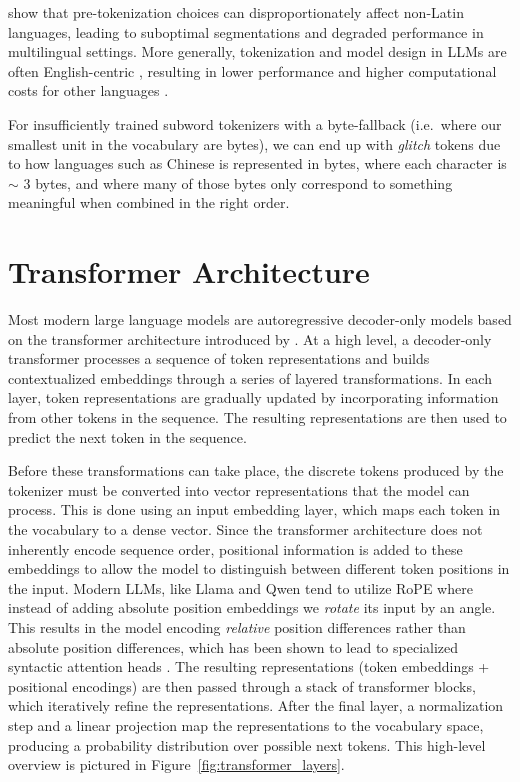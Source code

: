 \citet{arnett2025, wegmann2025} show that pre-tokenization choices can disproportionately affect non-Latin languages, leading to suboptimal segmentations and degraded performance in multilingual settings. More generally, tokenization and model design in LLMs are often English-centric \citep{joshi2020, blasi2022}, resulting in lower performance and higher computational costs for other languages \citep{ahia2023, petrov2023}.

For insufficiently trained subword tokenizers with a byte-fallback (i.e.\ where our smallest unit in the vocabulary are bytes), we can end up with \textit{glitch} tokens \citep{land2024} due to how languages such as Chinese is represented in bytes, where each character is $\sim$ 3 bytes, and where many of those bytes only correspond to something meaningful when combined in the right order.

\section{Transformer Architecture}\label{sec:background_transformer}

Most modern large language models are autoregressive decoder-only models based on the transformer architecture introduced by \citet{vaswani2017}. At a high level, a decoder-only transformer processes a sequence of token representations and builds contextualized embeddings through a series of layered transformations. In each layer, token representations are gradually updated by incorporating information from other tokens in the sequence. The resulting representations are then used to predict the next token in the sequence.

Before these transformations can take place, the discrete tokens produced by the tokenizer must be converted into vector representations that the model can process. This is done using an input embedding layer, which maps each token in the vocabulary to a dense vector. Since the transformer architecture does not inherently encode sequence order, positional information is added to these embeddings to allow the model to distinguish between different token positions in the input. Modern LLMs, like Llama \citep{llama2} and Qwen \citep{qwen2, qwen2.5} tend to utilize RoPE \citep{rope} where instead of adding absolute position embeddings we \textit{rotate} its input by an angle. This results in the model encoding \textit{relative} position differences rather than absolute position differences, which has been shown to lead to specialized syntactic attention heads \citep{barbero2025}. The resulting representations (token embeddings + positional encodings) are then passed through a stack of transformer blocks, which iteratively refine the representations. After the final layer, a normalization step and a linear projection map the representations to the vocabulary space, producing a probability distribution over possible next tokens. This high-level overview is pictured in Figure~\ref{fig:transformer_layers}.

